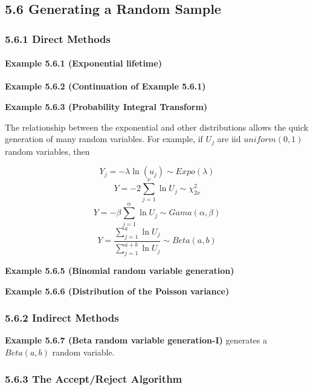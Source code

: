 \documentclass[6pt,twocolumn,Portrait]{article}
\let\oldparagraph\paragraph
\renewcommand{\paragraph}[1]{\oldparagraph{#1}\mbox{}}
\begin{document}
\hypertarget{generating-a-random-sample}{%
\subsection{5.6 Generating a Random
Sample}\label{generating-a-random-sample}}

\hypertarget{direct-methods}{%
\subsubsection{5.6.1 Direct Methods}\label{direct-methods}}

\hypertarget{lifetime}{%
\paragraph{\texorpdfstring{\textbf{Example 5.6.1 (Exponential
lifetime)}}{Example 5.6.1 (Exponential lifetime)}}\label{lifetime}}

\textbf{Example 5.6.2 (Continuation of Example 5.6.1)}

\textbf{Example 5.6.3 (Probability Integral Transform)}

The relationship between the exponential and other distributions allows
the quick generation of many random variables. For example, if \(U_j\)
are iid \(uniform(0,1)\) random variables, then

\[Y_j=-\lambda\ln(u_j)\sim Expo(\lambda)\]
\[Y=-2\sum_{j=1}^\nu\ln U_j\sim \chi^2_{2\nu}\]
\[Y=-\beta\sum_{j=1}^\alpha\ln U_j\sim Gama(\alpha,\beta)\]
\[Y=\frac{\sum_{j=1}^a\ln U_j}{\sum_{j=1}^{a+b}\ln U_j}\sim Beta(a,b)\]

\textbf{Example 5.6.5 (Binomial random variable generation)}

\textbf{Example 5.6.6 (Distribution of the Poisson variance)}

\hypertarget{indirect-methods}{%
\subsubsection{5.6.2 Indirect Methods}\label{indirect-methods}}

\textbf{Example 5.6.7 (Beta random variable generation-I)} generates a
\(Beta(a,b)\) random variable.

\hypertarget{the-acceptreject-algorithm}{%
\subsubsection{5.6.3 The Accept/Reject
Algorithm}\label{the-acceptreject-algorithm}}
\end{document}
